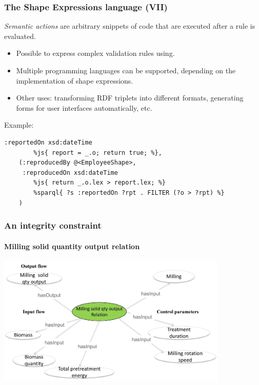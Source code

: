 \documentclass{beamer}
\begin{document}
\begin{frame}[fragile]
  \frametitle{The Shape Expressions language (VII)}

  \textit{Semantic actions} are arbitrary snippets of code that are executed
  after a rule is evaluated.

  \pause

  \begin{itemize}
    \item Possible to express complex validation rules using.

    \pause

    \item Multiple programming languages can be supported, depending on the
      implementation of shape expressions.

    \pause

    \item Other uses: transforming RDF triplets into different formats,
      generating forms for user interfaces automatically, etc.
  \end{itemize}

  \pause

  Example:

  \begin{Verbatim}[fontsize=\scriptsize]
    :reportedOn xsd:dateTime
        %js{ report = _.o; return true; %},
    (:reproducedBy @<EmployeeShape>,
     :reproducedOn xsd:dateTime
        %js{ return _.o.lex > report.lex; %}
        %sparql{ ?s :reportedOn ?rpt . FILTER (?o > ?rpt) %}
    )
  \end{Verbatim}
\end{frame}


\begin{frame}
  \frametitle{An integrity constraint}
  \framesubtitle{Milling solid quantity output relation}

  \begin{center}
  \includegraphics[width=11cm]{relation.jpg}
  \end{center}


\end{frame}
\end{document}
